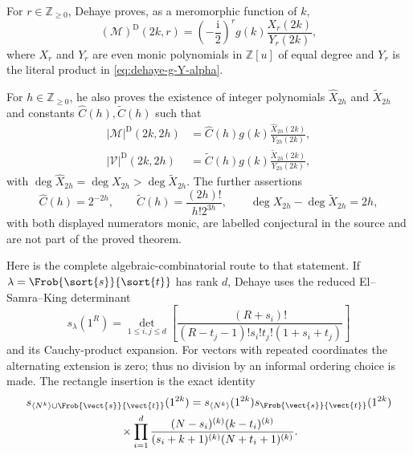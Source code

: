 \begin{theorem}
\label{thm:dehaye-rational-source}
For $r\in\mathbb Z_{\geq0}$, Dehaye proves, as a meromorphic function of $k$,
\begin{equation}
 (\mathcal M)^{\mathrm D}(2k,r)
 =\left(-\frac{\mathrm i}{2}\right)^r g(k)
   \frac{X_r(2k)}{Y_r(2k)},
 \label{eq:dehaye-complex-rational-form}
\end{equation}
where $X_r$ and $Y_r$ are even monic polynomials in $\mathbb Z[u]$ of equal
degree and $Y_r$ is the literal product in \eqref{eq:dehaye-g-Y-alpha}.

For $h\in\mathbb Z_{\geq0}$, he also proves the existence of integer polynomials
$\widehat X_{2h}$ and $\widetilde X_{2h}$ and constants
$\widehat C(h),\widetilde C(h)$ such that
\begin{align}
 |\mathcal M|^{\mathrm D}(2k,2h)
 &=\widehat C(h)g(k)\frac{\widehat X_{2h}(2k)}{Y_{2h}(2k)},
 \label{eq:dehaye-absolute-M-rational-form}\\
 |\mathcal V|^{\mathrm D}(2k,2h)
 &=\widetilde C(h)g(k)\frac{\widetilde X_{2h}(2k)}{Y_{2h}(2k)},
 \label{eq:dehaye-absolute-V-rational-form}
\end{align}
with
$\deg\widehat X_{2h}=\deg X_{2h}>\deg\widetilde X_{2h}$.
The further assertions
\[
 \widehat C(h)=2^{-2h},\qquad
 \widetilde C(h)=\frac{(2h)!}{h!2^{3h}},\qquad
 \deg X_{2h}-\deg\widetilde X_{2h}=2h,
\]
with both displayed numerators monic, are labelled conjectural in the source and are
not part of the proved theorem.
\end{theorem}

Here is the complete algebraic-combinatorial route to that statement.  If
$\lambda=\Frob{\sort{s}}{\sort{t}}$ has rank $d$, Dehaye uses the reduced
El--Samra--King determinant
\begin{equation}
 s_\lambda(1^R)=
 \det_{1\leq i,j\leq d}
 \left[\frac{(R+s_i)!}{(R-t_j-1)!s_i!t_j!(1+s_i+t_j)}\right]
 \label{eq:dehaye-frobenius-dimension}
\end{equation}
and its Cauchy-product expansion.  For vectors with repeated coordinates the
alternating extension is zero; thus no division by an informal ordering choice is
made.  The rectangle insertion is the exact identity
\begin{multline}
 s_{\langle N^k\rangle\cup\Frob{\vect{s}}{\vect{t}}}(1^{2k})
 =s_{\langle N^k\rangle}(1^{2k})s_{\Frob{\vect{s}}{\vect{t}}}(1^{2k})\\
 {}\times\prod_{i=1}^{d}
 \frac{(N-s_i)^{(k)}(k-t_i)^{(k)}}
 {(s_i+k+1)^{(k)}(N+t_i+1)^{(k)}}.
 \label{eq:dehaye-rectangle-insertion}
\end{multline}

